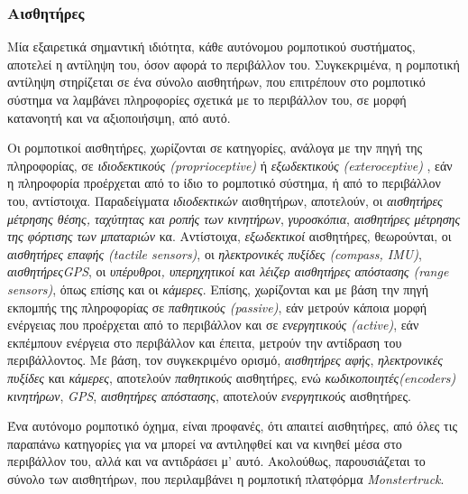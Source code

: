 \bigskip
\subsubsection{Αισθητήρες}
Μία εξαιρετικά σημαντική ιδιότητα, κάθε αυτόνομου ρομποτικού συστήματος, αποτελεί η αντίληψη του, όσον αφορά το περιβάλλον του. Συγκεκριμένα, η ρομποτική αντίληψη στηρίζεται σε ένα σύνολο αισθητήρων, που επιτρέπουν στο ρομποτικό σύστημα να λαμβάνει πληροφορίες σχετικά με το περιβάλλον του, σε μορφή κατανοητή και να αξιοποιήσιμη, από αυτό.

\bigskip
Οι ρομποτικοί αισθητήρες, χωρίζονται σε κατηγορίες, ανάλογα με την πηγή της πληροφορίας, σε \textit{ιδιοδεκτικούς (proprioceptive)} ή \textit{εξωδεκτικούς (exteroceptive)} \cite{autonomous_mobile_robots}, εάν η πληροφορία προέρχεται από το ίδιο το ρομποτικό σύστημα, ή από το περιβάλλον του, αντίστοιχα. Παραδείγματα \textit{ιδιοδεκτικών} αισθητήρων, αποτελούν, οι \textit{αισθητήρες μέτρησης θέσης, ταχύτητας και ροπής των κινητήρων}, \textit{γυροσκόπια}, \textit{αισθητήρες μέτρησης της φόρτισης των μπαταριών} κα. Αντίστοιχα, \textit{εξωδεκτικοί} αισθητήρες, θεωρούνται, οι \textit{αισθητήρες επαφής (tactile sensors)}, οι \textit{ηλεκτρονικές πυξίδες (compass, IMU)}, \textit{αισθητήρεςGPS}, οι \textit{υπέρυθροι, υπερηχητικοί και λέιζερ αισθητήρες απόστασης (range sensors)}, όπως επίσης και οι \textit{κάμερες}. Επίσης, χωρίζονται και με βάση την πηγή εκπομπής της πληροφορίας \cite{autonomous_mobile_robots} σε \textit{παθητικούς (passive)}, εάν μετρούν κάποια μορφή ενέργειας που προέρχεται από το περιβάλλον και σε \textit{ενεργητικούς (active)}, εάν εκπέμπουν ενέργεια στο περιβάλλον και έπειτα, μετρούν την αντίδραση του περιβάλλοντος. Με βάση, τον συγκεκριμένο ορισμό, \textit{αισθητήρες αφής}, \textit{ηλεκτρονικές πυξίδες} και \textit{κάμερες}, αποτελούν \textit{παθητικούς} αισθητήρες, ενώ \textit{κωδικοποιητές(encoders) κινητήρων}, \textit{GPS}, \textit{αισθητήρες απόστασης}, αποτελούν \textit{ενεργητικούς} αισθητήρες. 

\bigskip
Ένα αυτόνομο ρομποτικό όχημα, είναι προφανές, ότι απαιτεί αισθητήρες, από όλες τις παραπάνω κατηγορίες για να μπορεί να αντιληφθεί και να κινηθεί μέσα στο περιβάλλον του, αλλά και να αντιδράσει μ' αυτό. Ακολούθως, παρουσιάζεται το σύνολο των αισθητήρων, που περιλαμβάνει η ρομποτική πλατφόρμα \textit{Monstertruck}.

